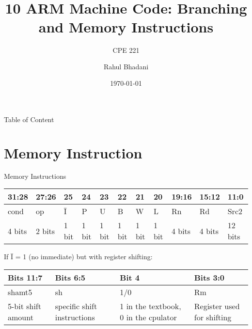 \documentclass[aspectratio=169]{beamer}
\title{10 ARM Machine Code: Branching and Memory Instructions}
\subtitle{CPE 221}
\author{Rahul Bhadani}
\institute{The University of Alabama in Huntsville}
\date{\today}
\begin{document}
\begin{frame}

    \titlepage

\end{frame}

\begin{frame}{Table of Content}
    \tableofcontents
\end{frame}


\section{Memory Instruction}

\begin{frame}
    \sectionpage
\end{frame}

\begin{frame}{Memory Instructions}
\begin{center}
    \renewcommand{\arraystretch}{1.5}
    \begin{tabular}{|p{3.0em}|p{3.0em}|p{1.5em}|p{1.5em}|p{1.5em}|p{1.5em}|p{1.5em}|p{1.5em}|p{3.0em}|p{3.0em}|p{3.0em}|}
    \hline
    31:28 & 27:26 & 25 & 24 & 23 & 22 & 21 & 20 & 19:16 & 15:12 & 11:0\\
    \hline
    cond & op & \=I & P & U & B & W & L & Rn & Rd & Src2\\
    \hline
    4 bits & 2 bits & 1 bit & 1 bit & 1 bit & 1 bit &  1 bit & 1 bit & 4 bits & 4 bits & 12 bits\\
    \hline
    \end{tabular}

    \vspace{0.5cm}
If \=I = 1 (no immediate) but with register shifting:

    \begin{tabular}{|p{6em}|p{6em}|p{6em}|p{5em}|}
        \hline
        Bits 11:7 & Bits 6:5 & Bit 4 & Bits 3:0\\
        \hline
        shamt5 & sh & 1/0 & Rm \\
        \hline
        5-bit shift amount & specific shift instructions & 1 in the textbook, 0 in the cpulator &  Register used for shifting\\
        \hline
    \end{tabular}
\end{center}
\end{frame}
\end{document}
